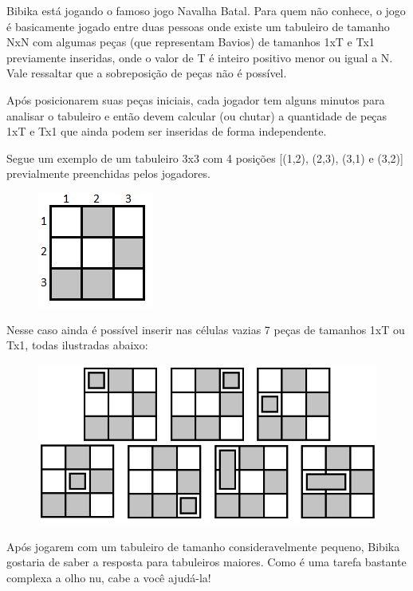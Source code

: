Bibika está jogando o famoso jogo Navalha Batal. Para quem não conhece, o jogo é basicamente jogado entre duas pessoas onde existe um tabuleiro de tamanho NxN com algumas peças (que representam Bavios) de tamanhos 1xT e Tx1 previamente inseridas, onde o valor de T é inteiro positivo menor ou igual a N. Vale ressaltar que a sobreposição de peças não é possível.

Após posicionarem suas peças iniciais, cada jogador tem alguns minutos para analisar o tabuleiro e então devem calcular (ou chutar) a quantidade de peças 1xT e Tx1 que ainda podem ser inseridas de forma independente. \newline

Segue um exemplo de um tabuleiro 3x3 com 4 posições [(1,2), (2,3), (3,1) e (3,2)] previalmente preenchidas pelos jogadores.

\begin{figure}[h!]
\centering
\includegraphics[scale=0.7]{tab_inicial.png}
\end{figure}

Nesse caso ainda é possível inserir nas células vazias 7 peças de tamanhos 1xT ou Tx1, todas ilustradas abaixo:

\begin{figure}[h!]
\centering
\includegraphics[scale=0.6]{pecas.png}
\end{figure}

Após jogarem com um tabuleiro de tamanho consideravelmente pequeno, Bibika gostaria de saber a resposta para tabuleiros maiores. Como é uma tarefa bastante complexa a olho nu, cabe a você ajudá-la!


